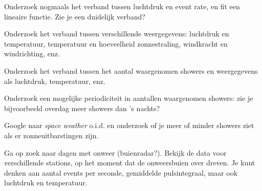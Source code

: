 \begin{questions}
\question Onderzoek nogmaals het verband tussen luchtdruk en event rate,
en fit een lineaire functie. Zie je een duidelijk verband?



\begin{savenotes}
\end{savenotes}

\question Onderzoek het verband tussen verschillende weergegevens:
luchtdruk en temperatuur, temperatuur en hoeveelheid zonnestraling,
windkracht en windrichting, enz.

\question Onderzoek het verband tussen het aantal waargenomen showers en
weergegevens als luchtdruk, temperatuur, enz.

\question Onderzoek een mogelijke periodiciteit in aantallen waargenomen
showers: zie je bijvoorbeeld overdag meer showers dan 's nachts?

\question Google naar \emph{space weather} o.i.d. en onderzoek of je meer
of minder showers ziet als er zonneuitbarstingen zijn.

\question Ga op zoek naar dagen met onweer (buienradar?). Bekijk de
\hisparc data voor verschillende stations, op het moment dat de
onweersbuien over dreven. Je kunt denken aan aantal events per seconde,
gemiddelde pulsintegraal, maar ook luchtdruk en temperatuur.

\end{questions}

